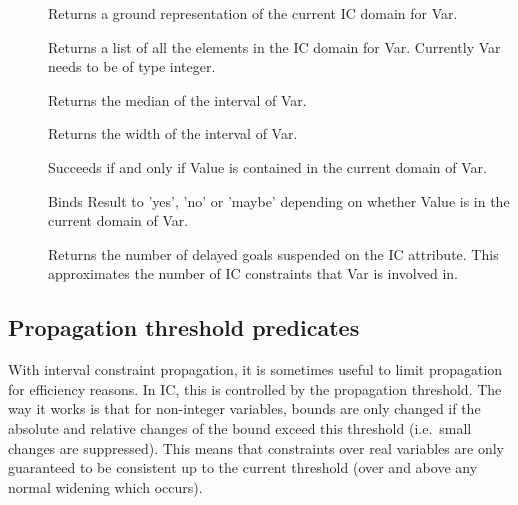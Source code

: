 \begin{description}
\item []
Returns a ground representation of the current IC domain for Var.

\item []
Returns a list of all the elements in the IC domain for Var.  Currently Var
needs to be of type integer.

\item []
Returns the median of the interval of Var.

\item []
Returns the width of the interval of Var.

\item []
Succeeds if and only if Value is contained in the current domain of Var.

\item []
Binds Result to 'yes', 'no' or 'maybe' depending on whether Value is
in the current domain of Var.

\item []
Returns the number of delayed goals suspended on the IC attribute. This
approximates the number of IC constraints that Var is involved in.

\end{description}


\subsection{Propagation threshold predicates}
\label{sec:propagation-threshold}

With interval constraint propagation, it is sometimes useful to limit
propagation for efficiency reasons.  In IC, this is controlled by the
propagation threshold.  The way it works is that for non-integer variables,
bounds are only changed if the absolute and relative changes of the bound
exceed this threshold (i.e.\ small changes are suppressed).  This means that
constraints over real variables are only guaranteed to be consistent up to
the current threshold (over and above any normal widening which occurs).

